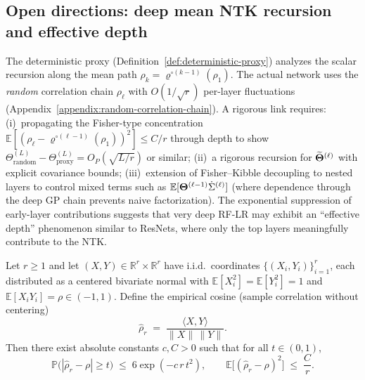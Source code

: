 \subsection{Open directions: deep mean NTK recursion and effective depth}\label{appendix:open-directions}
The deterministic proxy (Definition~\ref{def:deterministic-proxy}) analyzes the scalar recursion along the mean path \( \rho_k = \varrho^{\circ(k-1)}(\rho_1) \). The actual network uses the \emph{random} correlation chain \( \rho_\ell \) with \( O(1/\sqrt{r}) \) per-layer fluctuations (Appendix~\ref{appendix:random-correlation-chain}). A rigorous link requires: (i)~propagating the Fisher-type concentration \( \mathbb{E}[(\rho_\ell - \varrho^{\circ(\ell-1)}(\rho_1))^2] \le C/r \) through depth to show \( \Theta^{(L)}_{\mathrm{random}} - \Theta^{(L)}_{\mathrm{proxy}} = O_P(\sqrt{L/r}) \) or similar; (ii)~a rigorous recursion for \( \widetilde{\boldsymbol{\Theta}}^{(\ell)} \) with explicit covariance bounds; (iii)~extension of Fisher--Kibble decoupling to nested layers to control mixed terms such as \( \mathbb{E}[\boldsymbol{\Theta}^{(\ell-1)}\dot{\Sigma}^{(\ell)}] \) (where dependence through the deep GP chain prevents naive factorization). The exponential suppression of early-layer contributions suggests that very deep RF-LR may exhibit an ``effective depth'' phenomenon similar to ResNets, where only the top layers meaningfully contribute to the NTK.

\begin{lemma}\label{lem:gaussian-sample-cosine}
Let \(r\ge 1\) and let \((X,Y)\in\mathbb{R}^r\times\mathbb{R}^r\) have i.i.d.\ coordinates \(\{(X_i,Y_i)\}_{i=1}^r\), each distributed as a centered bivariate normal with \(\mathbb{E}[X_i^2]=\mathbb{E}[Y_i^2]=1\) and \(\mathbb{E}[X_iY_i]=\rho\in(-1,1)\).
Define the empirical cosine (sample correlation without centering)
\[
\widehat{\rho}_r \;=\; \frac{\langle X,Y\rangle}{\|X\|\,\|Y\|}.
\]
Then there exist absolute constants \(c,C>0\) such that for all \(t\in(0,1)\),
\[
\mathbb{P}\big(|\widehat{\rho}_r-\rho|\ge t\big)\;\le\;6\exp(-c\,r\,t^2),
\qquad
\mathbb{E}\big[(\widehat{\rho}_r-\rho)^2\big]\;\le\;\frac{C}{r}.
\]
\end{lemma}
